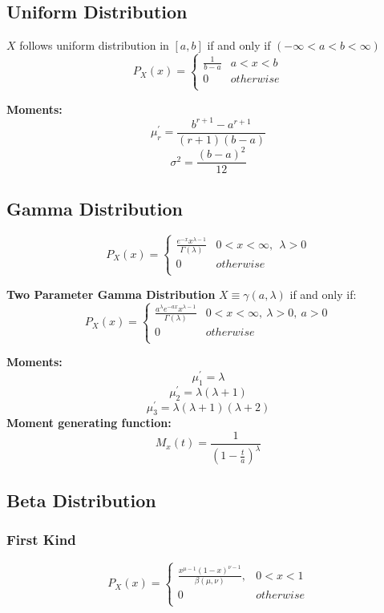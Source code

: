 \documentclass{article}
\begin{document}
\subsection{Uniform Distribution}
$X$ follows uniform distribution in $[a, b]$ if and only if $(-\infty < a < b < \infty)$
$$ P_X(x)=    \left\{
\begin{array}{ll}
     \frac{1}{b-a} & a<x<b \\
      0 & otherwise \\
\end{array} 
\right. $$

\textbf{Moments:}$$\mu_r^{'}=\frac{b^{r+1}-a^{r+1}}{(r+1)(b-a)}$$
$$\sigma^2=\frac{(b-a)^2}{12}$$

\subsection{Gamma Distribution}
$$ P_X(x)=    \left\{
\begin{array}{ll}
     \frac{e^{-x}x^{\lambda-1}}{\Gamma(\lambda)} & 0<x<\infty,~~\lambda>0 \\
      0 & otherwise \\
\end{array} 
\right. $$

\textbf{Two Parameter Gamma Distribution}
$X \equiv \gamma(a, \lambda)$ if and only if:
$$ P_X(x)=\left\{
\begin{array}{ll}
     \frac{a^\lambda e^{-ax}x^{\lambda-1}}{\Gamma(\lambda)} & 0<x<\infty,~\lambda>0, ~ a > 0 \\
      0 & otherwise \\
\end{array} 
\right. $$

\textbf{Moments:} $$\mu_1^\prime=\lambda$$ $$\mu_2^\prime=\lambda(\lambda+1)$$ $$\mu_3^\prime=\lambda(\lambda+1)(\lambda+2)$$
\textbf{Moment generating function:} $$M_x(t)=\frac{1}{(1-\frac{t}{a})^\lambda}$$

\subsection{Beta Distribution}
\subsubsection{First Kind}
$$ P_X(x)=\left\{
\begin{array}{ll}
     \frac{x^{\mu-1}(1-x)^{\nu-1}}{\beta (\mu, \nu)}, & 0 < x < 1 \\
      0 & otherwise \\
\end{array} 
\right. $$
\end{document}
